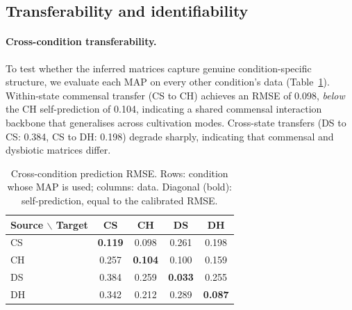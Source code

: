 \documentclass[11pt,a4paper]{article}
\begin{document}
%
%


\subsection{Transferability and identifiability}
\label{sec:sensitivity}

\paragraph{Cross-condition transferability.}
To test whether the inferred matrices capture genuine condition-specific structure, we evaluate each MAP on every other condition's data (Table~\ref{tab:cross_prediction}).
Within-state commensal transfer (CS to CH) achieves an RMSE of 0.098, \emph{below} the CH self-prediction of 0.104, indicating a shared commensal interaction backbone that generalises across cultivation modes.
Cross-state transfers (DS to CS: 0.384, CS to DH: 0.198) degrade sharply, indicating that commensal and dysbiotic matrices differ.

\begin{table}[htbp]
\centering\small
\begin{tabular}{@{}lcccc@{}}
\toprule
Source $\backslash$ Target & CS & CH & DS & DH \\
\midrule
CS & \textbf{0.119} & 0.098 & 0.261 & 0.198 \\
CH & 0.257 & \textbf{0.104} & 0.100 & 0.159 \\
DS & 0.384 & 0.259 & \textbf{0.033} & 0.255 \\
DH & 0.342 & 0.212 & 0.289 & \textbf{0.087} \\
\bottomrule
\end{tabular}
\caption{Cross-condition prediction RMSE. Rows: condition whose MAP is used; columns: data. Diagonal (bold): self-prediction, equal to the calibrated RMSE.}
\label{tab:cross_prediction}
\end{table}
\end{document}
